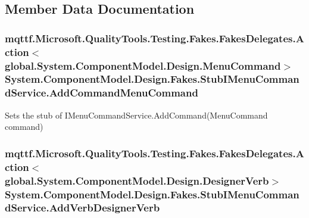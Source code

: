 \subsection{Member Data Documentation}
\hypertarget{class_system_1_1_component_model_1_1_design_1_1_fakes_1_1_stub_i_menu_command_service_ad8fc10673ba8f28397489fbbeeb276ff}{
\subsubsection[{Add\-Command\-Menu\-Command}]{\setlength{\rightskip}{0pt plus 5cm}mqttf.\-Microsoft.\-Quality\-Tools.\-Testing.\-Fakes.\-Fakes\-Delegates.\-Action$<$global.\-System.\-Component\-Model.\-Design.\-Menu\-Command$>$ System.\-Component\-Model.\-Design.\-Fakes.\-Stub\-I\-Menu\-Command\-Service.\-Add\-Command\-Menu\-Command}}\label{class_system_1_1_component_model_1_1_design_1_1_fakes_1_1_stub_i_menu_command_service_ad8fc10673ba8f28397489fbbeeb276ff}


Sets the stub of I\-Menu\-Command\-Service.\-Add\-Command(\-Menu\-Command command)

\hypertarget{class_system_1_1_component_model_1_1_design_1_1_fakes_1_1_stub_i_menu_command_service_ac410b86577856e1aea8c77b4f473c171}{
\subsubsection[{Add\-Verb\-Designer\-Verb}]{\setlength{\rightskip}{0pt plus 5cm}mqttf.\-Microsoft.\-Quality\-Tools.\-Testing.\-Fakes.\-Fakes\-Delegates.\-Action$<$global.\-System.\-Component\-Model.\-Design.\-Designer\-Verb$>$ System.\-Component\-Model.\-Design.\-Fakes.\-Stub\-I\-Menu\-Command\-Service.\-Add\-Verb\-Designer\-Verb}}\label{class_system_1_1_component_model_1_1_design_1_1_fakes_1_1_stub_i_menu_command_service_ac410b86577856e1aea8c77b4f473c171}


